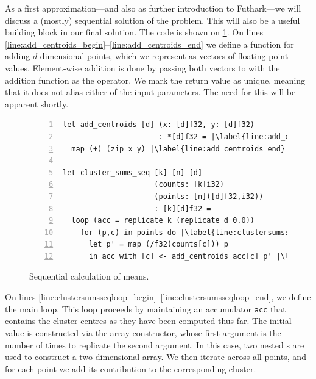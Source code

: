 As a first approximation---and also as further introduction to
Futhark---we will discuss a (mostly) sequential solution of the
problem.  This will also be a useful building block in our final
solution.  The code is shown on \cref{fig:sequential-means}.  On lines
\ref{line:add_centroids_begin}--\ref{line:add_centroids_end} we define
a function for adding $d$-dimensional points, which we represent as
vectors of floating-point values.  Element-wise addition is done by
passing both vectors to  with the addition function as the
operator.  We mark the return value as unique, meaning that it does
not alias either of the input parameters.  The need for this will be
apparent shortly.

\begin{figure}
\begin{lstlisting}[numbers=left,escapechar=|,xleftmargin=0pt]
let add_centroids [d] (x: [d]f32, y: [d]f32)
                      : *[d]f32 = |\label{line:add_centroids_begin}|
  map (+) (zip x y) |\label{line:add_centroids_end}|

let cluster_sums_seq [k] [n] [d]
                     (counts: [k]i32)
                     (points: [n]([d]f32,i32))
                     : [k][d]f32 =
  loop (acc = replicate k (replicate d 0.0))
    for (p,c) in points do |\label{line:clustersumsseqloop_begin}|
      let p' = map (/f32(counts[c])) p
      in acc with [c] <- add_centroids acc[c] p' |\label{line:clustersumsseqloop_end}|
\end{lstlisting}
\caption{Sequential calculation of means.}
\label{fig:sequential-means}
\end{figure}

On lines
\ref{line:clustersumsseqloop_begin}--\ref{line:clustersumsseqloop_end},
we define the main loop.  This loop proceeds by maintaining an
accumulator \texttt{acc} that contains the cluster centres as they
have been computed thus far.  The initial value is constructed via the
 array constructor, whose first argument is the number
of times to replicate the second argument.  In this case, two nested
s are used to construct a two-dimensional array.  We
then iterate across all points, and for each point we add its
contribution to the corresponding cluster.

